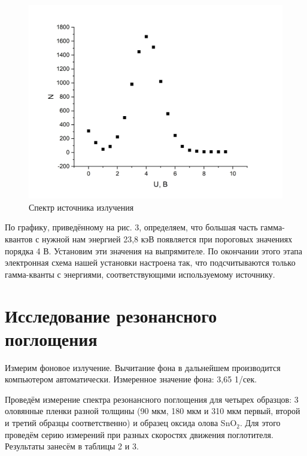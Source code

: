 \documentclass[a4paper, 12pt]{article}
\begin{document}
\begin{figure}[h!]
\begin{center}
\includegraphics[scale=0.32]{3} %
\caption{Спектр источника излучения}
\end{center}
\end{figure}

По графику, приведённому на рис. 3, определяем, что большая часть гамма-квантов с нужной нам энергией 23,8 кэВ появляется при пороговых значениях порядка 4 В. Установим эти значения на выпрямителе. По окончании этого этапа электронная схема нашей установки настроена так, что подсчитываются только гамма-кванты с энергиями, соответствующими используемому источнику.

\section{Исследование резонансного поглощения}

Измерим фоновое излучение. Вычитание фона в дальнейшем производится компьютером автоматически. Измеренное значение фона: 3,65 1/сек.

Проведём измерение спектра резонансного поглощения для четырех образцов: 3 оловянные пленки разной толщины (90 мкм, 180 мкм и 310 мкм первый, второй и третий образцы соответственно) и образец оксида олова SnO$_2$. Для этого проведём серию измерений при разных скоростях движения поглотителя. Результаты занесём в таблицы 2 и 3.
\end{document}
